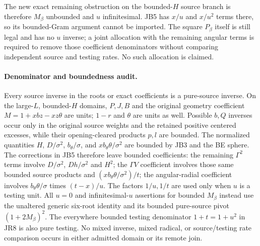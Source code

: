 The new exact remaining obstruction on the bounded-$H$ source branch
is therefore $M_\beta$ unbounded and $u$ infinitesimal. JB5 has
$x/u$ and $x/u^2$ terms there, so its bounded-Gram argument cannot be
imported. The square $P_\beta$ itself is still legal and has no
$u$ inverse; a joint allocation with the remaining angular terms is
required to remove those coefficient denominators without comparing
independent source and testing rates. No such allocation is claimed.

\paragraph{Denominator and boundedness audit.}
Every source inverse in the roots or exact coefficients is a pure-source
inverse. On the large-$L$, bounded-$H$ domains, $P,J,B$ and the original
geometry coefficient $M=1+xbz-xz\theta$ are units; $1-r$ and $\theta$
are units as well. Possible $b,Q$ inverses occur only in the original
source weights and the retained positive centered excesses, while their
opening-cleared products $p,l$ are bounded. The normalized quantities
$H$, $D/\sigma^2$, $b_\theta/\sigma$, and
$xb_\theta\theta/\sigma^2$ are bounded by JB3 and the BE sphere.
The corrections in JB5 therefore leave bounded coefficients: the
remaining $\Gamma^2$ terms involve $D/\sigma^2$, $Dh/\sigma^2$ and
$H^2$; the $\Gamma V$ coefficient involves those same bounded source
products and $(xb_\theta\theta/\sigma^2)/t$; the angular-radial
coefficient involves $b_\theta\theta/\sigma$ times $(t-x)/u$.
The factors $1/u,1/t$ are used only when $u$ is a testing unit.
All $u=0$ and infinitesimal-$u$ assertions for bounded $M_\beta$
instead use the unaltered generic six-root identity and its bounded
pure-source pivot $(1+2M_\beta)^2$. The everywhere bounded testing
denominator $1+t=1+u^2$ in JR8 is also pure testing. No mixed inverse,
mixed radical, or source/testing rate comparison occurs in either
admitted domain or its remote join.
